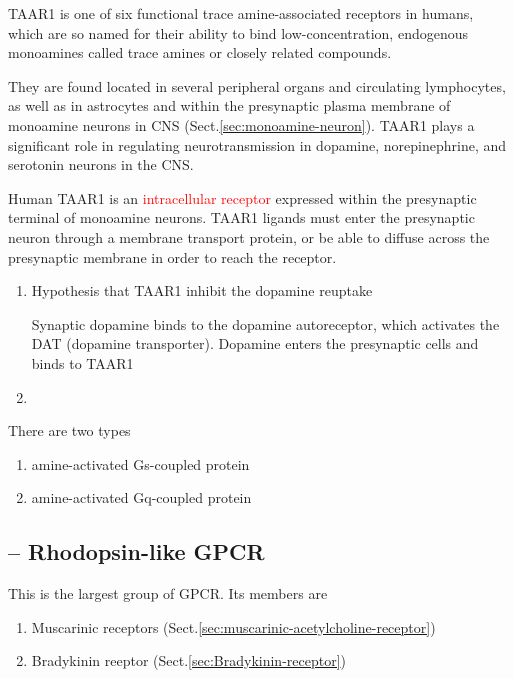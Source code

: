 TAAR1 is one of six functional trace amine-associated receptors in humans, which
are so named for their ability to bind low-concentration, endogenous monoamines
called trace amines or closely related compounds.

They are found located in several peripheral organs and circulating
lymphocytes, as well as in astrocytes and within the presynaptic plasma membrane
of monoamine neurons in CNS (Sect.\ref{sec:monoamine-neuron}).
TAAR1 plays a significant role in regulating neurotransmission in dopamine,
norepinephrine, and serotonin neurons in the CNS.

Human TAAR1 is an \textcolor{red}{intracellular receptor} expressed within the
presynaptic terminal of monoamine neurons.  TAAR1 ligands must enter the
presynaptic neuron through a membrane transport protein, or be able to diffuse
across the presynaptic membrane in order to reach the receptor.
\begin{enumerate}
  \item Hypothesis that TAAR1 inhibit the dopamine reuptake
  
  Synaptic dopamine binds to the dopamine autoreceptor, which activates the DAT
  (dopamine transporter). Dopamine enters the presynaptic cells and binds to
  TAAR1
  
  
  \item 
\end{enumerate}

There are two types
\begin{enumerate}
  \item amine-activated Gs-coupled protein
  
  \item amine-activated Gq-coupled protein
\end{enumerate}



\subsection{-- Rhodopsin-like GPCR}
\label{sec:rhodopsin-like-GPCR}

This is the largest group of GPCR. Its members are
\begin{enumerate}
  \item Muscarinic receptors (Sect.\ref{sec:muscarinic-acetylcholine-receptor})
  \item Bradykinin reeptor (Sect.\ref{sec:Bradykinin-receptor})
\end{enumerate}

